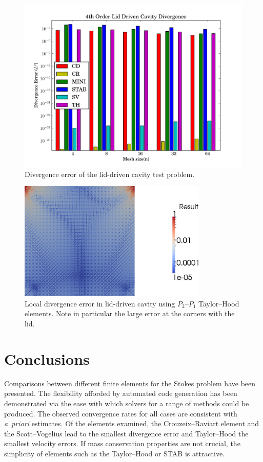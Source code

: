 \begin{figure}
  \center \includegraphics[width=\largefig]{chapters/terrel/pdf/div_4_test.pdf}
  \caption{Divergence error of the lid-driven cavity test problem.}
\label{fig:terrel:4th_Order_lid}
\end{figure}

\begin{figure}
  \center\includegraphics[width=0.8\textwidth]{chapters/terrel/png/lid_div_error.png}
  \caption{Local divergence error in lid-driven cavity using $P_2$--$P_1$
  Taylor--Hood elements. Note in particular the large error at the corners with
  the lid.}
  \label{fig:terrel:lid_div_error}
\end{figure}

\section{Conclusions}

Comparisons between different finite elements for the Stokes problem
have been presented. The flexibility afforded by automated code
generation has been demonstrated via the ease with which solvers for a
range of methods could be produced. The observed convergence rates for
all cases are consistent with \emph{a~priori} estimates. Of the
elements examined, the Crouzeix--Raviart element and the
Scott--Vogelius lead to the smallest divergence error and Taylor--Hood
the smallest velocity errors. If mass conservation properties are not
crucial, the simplicity of elements such as the Taylor--Hood or STAB
is attractive.
